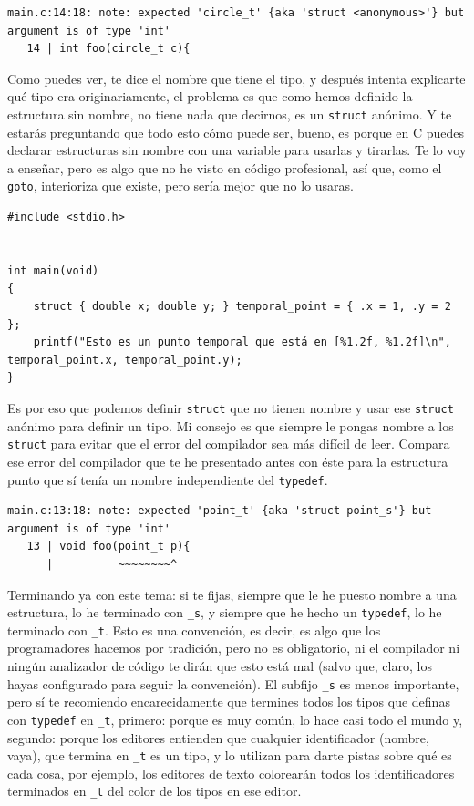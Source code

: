 \documentclass[a4paper]{article}
\begin{document}
\begin{lstlisting}[style=terminalStyle]
main.c:14:18: note: expected 'circle_t' {aka 'struct <anonymous>'} but argument is of type 'int'
   14 | int foo(circle_t c){
\end{lstlisting}

Como puedes ver, te dice el nombre que tiene el tipo, y después intenta
explicarte qué tipo era originariamente, el problema es que como hemos definido
la estructura sin nombre, no tiene nada que decirnos, es un \verb!struct!
anónimo. Y te estarás preguntando que todo esto cómo puede ser, bueno, es porque
en C puedes declarar estructuras sin nombre con una variable para usarlas
y tirarlas. Te lo voy a enseñar, pero es algo que no he visto en código
profesional, así que, como el \verb!goto!, interioriza que existe, pero sería
mejor que no lo usaras.

\noindent
\begin{minipage}[H]{\linewidth}
\mbox{}
\begin{lstlisting}[style=C,
caption={Estructura anónima y efímera},
label={lst:anonymousStruct}]
#include <stdio.h>


int main(void)
{
    struct { double x; double y; } temporal_point = { .x = 1, .y = 2 };
    printf("Esto es un punto temporal que está en [%1.2f, %1.2f]\n", temporal_point.x, temporal_point.y);
}
\end{lstlisting}
\end{minipage}

Es por eso que podemos definir \verb!struct! que no tienen nombre y usar ese
\verb!struct! anónimo para definir un tipo. Mi consejo es que siempre le pongas
nombre a los \verb!struct! para evitar que el error del compilador sea más
difícil de leer. Compara ese error del compilador que te he presentado antes con
éste para la estructura punto que sí tenía un nombre independiente del
\verb!typedef!.


\begin{lstlisting}[style=terminalStyle]
main.c:13:18: note: expected 'point_t' {aka 'struct point_s'} but argument is of type 'int'
   13 | void foo(point_t p){
      |          ~~~~~~~~^
\end{lstlisting}

Terminando ya con este tema: si te fijas, siempre que le he puesto nombre a una
estructura, lo he terminado con \verb!_s!, y siempre que he hecho un
\verb!typedef!, lo he terminado con \verb!_t!. Esto es una convención, es decir,
es algo que los programadores hacemos por tradición, pero no es obligatorio,
ni el compilador ni ningún analizador de código te dirán que esto está mal
(salvo que, claro, los hayas configurado para seguir la convención). El subfijo
\verb!_s! es menos importante, pero sí te recomiendo encarecidamente que
termines todos los tipos que definas con \verb!typedef! en \verb!_t!, primero:
porque es muy común, lo hace casi todo el mundo y, segundo: porque los editores
entienden que cualquier identificador (nombre, vaya), que termina en \verb!_t!
es un tipo, y lo utilizan para darte pistas sobre qué es cada cosa, por ejemplo,
los editores de texto colorearán todos los identificadores terminados en
\verb!_t! del color de los tipos en ese editor.
\end{document}

